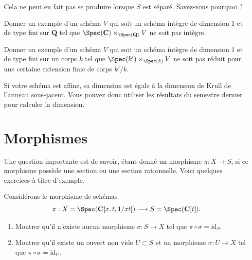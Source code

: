 \begin{remark}
\label{remark-separated-base-fibre-product-affines-affine}
Cela ne peut en fait pas se produire lorsque $S$ est séparé. Savez-vous pourquoi ?
\end{remark}

\begin{exercise}
\label{exercise-not-geometrically-integral}
Donner un exemple d'un schéma
$V$ qui soit un schéma intègre de dimension 1 et de type fini
sur ${\mathbf Q}$ tel que
$\Spec({\mathbf C}) \times_{\Spec({\mathbf Q})} V$
ne soit pas intègre.
\end{exercise}

\begin{exercise}
\label{exercise-not-geometrically-reduced}
Donner un exemple d'un schéma
$V$ qui soit un schéma intègre de dimension 1 et de type fini
sur un corps $k$ tel que $\Spec(k') \times_{\Spec(k)} V$
ne soit pas réduit pour une certaine extension finie de corps $k'/k$.
\end{exercise}

\begin{remark}
\label{remark-affine-dimension}
Si votre schéma est affine, sa dimension est
égale à la dimension de Krull de l'anneau sous-jacent. Vous pouvez donc
utiliser les résultats du semestre dernier pour calculer la dimension.
\end{remark}






\section{Morphismes}
\label{section-morphisms}

\noindent
Une question importante est de savoir, étant donné un morphisme $\pi : X \to S$,
si ce morphisme possède une section ou une section rationnelle.
Voici quelques exercices à titre d'exemple.

\begin{exercise}
\label{exercise-no-section}
Considérons le morphisme de schémas
$$
\pi :
X = \Spec(\mathbf{C}[x, t, 1/xt])
\longrightarrow
S = \Spec(\mathbf{C}[t]).
$$
\begin{enumerate}
\item Montrer qu'il n'existe aucun morphisme $\sigma : S \to X$
tel que $\pi \circ \sigma = \text{id}_S$.
\item Montrer qu'il existe un ouvert non vide $U \subset S$ et
un morphisme $\sigma : U \to X$ tel que $\pi \circ \sigma = \text{id}_U$.
\end{enumerate}
\end{exercise}

